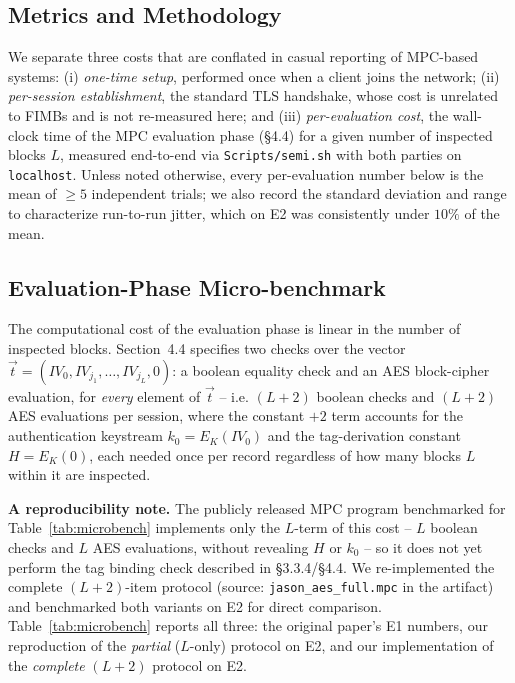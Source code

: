 \subsection{Metrics and Methodology}
\label{sec:eval-methodology}

We separate three costs that are conflated in casual reporting of
MPC-based systems: (i) \emph{one-time setup}, performed once when a
client joins the network; (ii) \emph{per-session establishment}, the
standard TLS handshake, whose cost is unrelated to FIMBs and is not
re-measured here; and (iii) \emph{per-evaluation cost}, the wall-clock
time of the MPC evaluation phase (\S4.4) for a given number of
inspected blocks $L$, measured end-to-end via
\texttt{Scripts/semi.sh} with both parties on \texttt{localhost}.
Unless noted otherwise, every per-evaluation number below is the mean
of $\geq 5$ independent trials; we also record the standard deviation
and range to characterize run-to-run jitter, which on E2 was
consistently under $10\%$ of the mean.

\subsection{Evaluation-Phase Micro-benchmark}
\label{sec:eval-microbench}

The computational cost of the evaluation phase is linear in the number
of inspected blocks. Section~4.4 specifies two checks over the vector
$\vec t = (IV_0, IV_{j_1}, \ldots, IV_{j_L}, 0)$: a boolean equality
check and an AES block-cipher evaluation, for \emph{every} element of
$\vec t$ -- i.e. $(L+2)$ boolean checks and $(L+2)$ AES evaluations per
session, where the constant $+2$ term accounts for the authentication
keystream $k_0 = E_K(IV_0)$ and the tag-derivation constant $H =
E_K(0)$, each needed once per record regardless of how many blocks
$L$ within it are inspected.

\textbf{A reproducibility note.} The publicly released MPC program
benchmarked for Table~\ref{tab:microbench} implements only the
$L$-term of this cost -- $L$ boolean checks and $L$ AES evaluations,
without revealing $H$ or $k_0$ -- so it does not yet perform the tag
binding check described in \S3.3.4/\S4.4. We re-implemented the
complete $(L+2)$-item protocol (source:
\texttt{jason\_aes\_full.mpc} in the artifact) and benchmarked both
variants on E2 for direct comparison. Table~\ref{tab:microbench}
reports all three: the original paper's E1 numbers, our reproduction
of the \emph{partial} ($L$-only) protocol on E2, and our
implementation of the \emph{complete} $(L+2)$ protocol on E2.

